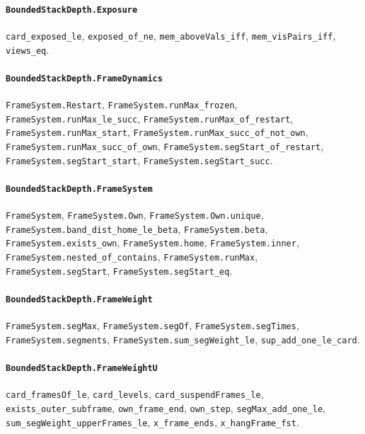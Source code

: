 \paragraph{\texttt{BoundedStackDepth.Exposure}}
{\small\raggedright \texttt{card\_exposed\_le}, \texttt{exposed\_of\_ne}, \texttt{mem\_aboveVals\_iff}, \texttt{mem\_visPairs\_iff}, \texttt{views\_eq}.\par}

\paragraph{\texttt{BoundedStackDepth.FrameDynamics}}
{\small\raggedright \texttt{FrameSystem.Restart}, \texttt{FrameSystem.runMax\_frozen}, \texttt{FrameSystem.runMax\_le\_succ}, \texttt{FrameSystem.runMax\_of\_restart}, \texttt{FrameSystem.runMax\_start}, \texttt{FrameSystem.runMax\_succ\_of\_not\_own}, \texttt{FrameSystem.runMax\_succ\_of\_own}, \texttt{FrameSystem.segStart\_of\_restart}, \texttt{FrameSystem.segStart\_start}, \texttt{FrameSystem.segStart\_succ}.\par}

\paragraph{\texttt{BoundedStackDepth.FrameSystem}}
{\small\raggedright \texttt{FrameSystem}, \texttt{FrameSystem.Own}, \texttt{FrameSystem.Own.unique}, \texttt{FrameSystem.band\_dist\_home\_le\_beta}, \texttt{FrameSystem.beta}, \texttt{FrameSystem.exists\_own}, \texttt{FrameSystem.home}, \texttt{FrameSystem.inner}, \texttt{FrameSystem.nested\_of\_contains}, \texttt{FrameSystem.runMax}, \texttt{FrameSystem.segStart}, \texttt{FrameSystem.segStart\_eq}.\par}

\paragraph{\texttt{BoundedStackDepth.FrameWeight}}
{\small\raggedright \texttt{FrameSystem.segMax}, \texttt{FrameSystem.segOf}, \texttt{FrameSystem.segTimes}, \texttt{FrameSystem.segments}, \texttt{FrameSystem.sum\_segWeight\_le}, \texttt{sup\_add\_one\_le\_card}.\par}

\paragraph{\texttt{BoundedStackDepth.FrameWeightU}}
{\small\raggedright \texttt{card\_framesOf\_le}, \texttt{card\_levels}, \texttt{card\_suspendFrames\_le}, \texttt{exists\_outer\_subframe}, \texttt{own\_frame\_end}, \texttt{own\_step}, \texttt{segMax\_add\_one\_le}, \texttt{sum\_segWeight\_upperFrames\_le}, \texttt{x\_frame\_ends}, \texttt{x\_hangFrame\_fst}.\par}

